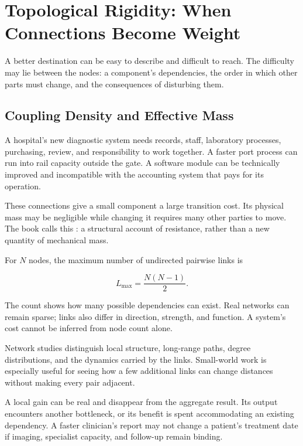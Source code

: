 \section{Topological Rigidity: When Connections Become Weight}

A better destination can be easy to describe and difficult to reach. The difficulty may lie between the nodes: a component's dependencies, the order in which other parts must change, and the consequences of disturbing them.

\subsection{Coupling Density and Effective Mass}


A hospital's new diagnostic system needs records, staff, laboratory processes, purchasing, review, and responsibility to work together. A faster port process can run into rail capacity outside the gate. A software module can be technically improved and incompatible with the accounting system that pays for its operation.

These connections give a small component a large transition cost. Its physical mass may be negligible while changing it requires many other parties to move. The book calls this : a structural account of resistance, rather than a new quantity of mechanical mass.

For $N$ nodes, the maximum number of undirected pairwise links is

\begin{equation}
L_{\max}=\frac{N(N-1)}2.
\end{equation}

The count shows how many possible dependencies can exist. Real networks can remain sparse; links also differ in direction, strength, and function. A system's cost cannot be inferred from node count alone.

Network studies distinguish local structure, long-range paths, degree distributions, and the dynamics carried by the links.\cite{boccaletti2006complex,watts1998collective} Small-world work is especially useful for seeing how a few additional links can change distances without making every pair adjacent.\cite{milgram1967smallworld,travers1969experimental}


A local gain can be real and disappear from the aggregate result. Its output encounters another bottleneck, or its benefit is spent accommodating an existing dependency. A faster clinician's report may not change a patient's treatment date if imaging, specialist capacity, and follow-up remain binding.

